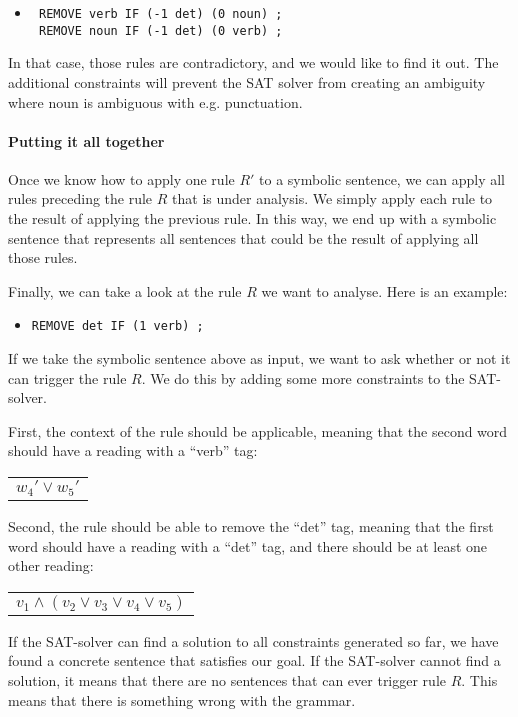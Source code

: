  \begin{itemize}
 \item[] \begin{verbatim}
 REMOVE verb IF (-1 det) (0 noun) ;
 REMOVE noun IF (-1 det) (0 verb) ;
 \end{verbatim}
 \end{itemize}

 In that case, those rules are contradictory, and we would like to find it out. The additional constraints will prevent the SAT solver from creating an ambiguity where noun is ambiguous with e.g. punctuation.


\paragraph{Putting it all together}

Once we know how to apply one rule $R'$ to a symbolic sentence, we can apply all rules preceding the rule $R$ that is under analysis. We simply apply each rule to the result of applying the previous rule. In this way, we end up with a symbolic sentence that represents all sentences that could be the result of applying all those rules.

Finally, we can take a look at the rule $R$ we want to analyse. Here is an example:
\begin{itemize}
\item[] \texttt{REMOVE det IF (1 verb) ;}
\end{itemize}
If we take the symbolic sentence above as input, we want to ask whether or not it can trigger the rule $R$. We do this by adding some more constraints to the SAT-solver.

First, the context of the rule should be applicable, meaning that the second word should have a reading with a ``verb'' tag:
\begin{center}
\begin{tabular}{c}
$w_4' \vee w_5'$
\end{tabular}
\end{center}
Second, the rule should be able to remove the ``det'' tag, meaning that the first word should have a reading with a ``det'' tag, and there should be at least one other reading:
\begin{center}
\begin{tabular}{c}
$v_1 \wedge (v_2 \vee v_3 \vee v_4 \vee v_5)$
\end{tabular}
\end{center}
If the SAT-solver can find a solution to all constraints generated so far, we have found a concrete sentence that satisfies our goal. If the SAT-solver cannot find a solution, it means that there are no sentences that can ever trigger rule $R$. This means that there is something wrong with the grammar.

